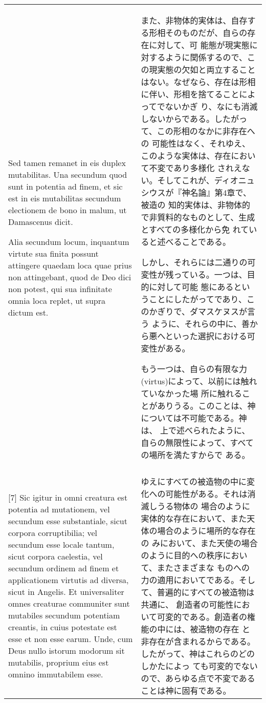 \documentclass[10pt]{jsarticle} %
\begin{document}
\begin{longtable}{p{21em}p{21em}}
Sed tamen remanet in eis duplex mutabilitas. Una secundum quod sunt in
potentia ad finem, et sic est in eis mutabilitas secundum electionem
de bono in malum, ut Damascenus dicit.

Alia secundum locum, inquantum virtute sua finita possunt attingere
quaedam loca quae prius non attingebant, quod de Deo dici non potest,
qui sua infinitate omnia loca replet, ut supra dictum est.

&

また、非物体的実体は、自存する形相そのものだが、自らの存在に対して、可
能態が現実態に対するように関係するので、この現実態の欠如と両立すること
はない。なぜなら、存在は形相に伴い、形相を捨てることによってでないかぎ
り、なにも消滅しないからである。したがって、この形相のなかに非存在への
可能性はなく、それゆえ、このような実体は、存在において不変であり多様化
されえない。そしてこれが、ディオニュシウスが『神名論』第4章で、被造の
知的実体は、非物体的で非質料的なものとして、生成とすべての多様化から免
れていると述べることである。

しかし、それらには二通りの可変性が残っている。一つは、目的に対して可能
態にあるということにしたがってであり、このかぎりで、ダマスケヌスが言う
ように、それらの中に、善から悪へといった選択における可変性がある。

もう一つは、自らの有限な力(virtus)によって、以前には触れていなかった場
所に触れることがありうる。このことは、神については不可能である。神は、
上で述べられたように、自らの無限性によって、すべての場所を満たすからで
ある。

\\


\\

[7] Sic igitur in omni creatura est potentia ad mutationem, vel secundum
esse substantiale, sicut corpora corruptibilia; vel secundum esse
locale tantum, sicut corpora caelestia, vel secundum ordinem ad finem
et applicationem virtutis ad diversa, sicut in Angelis.
Et universaliter omnes creaturae communiter sunt mutabiles secundum
potentiam creantis, in cuius potestate est esse et non esse
earum. Unde, cum Deus nullo istorum modorum sit mutabilis, proprium
eius est omnino immutabilem esse.
&


ゆえにすべての被造物の中に変化への可能性がある。それは消滅しうる物体の
場合のように実体的な存在において、また天体の場合のように場所的な存在の
みにおいて、また天使の場合のように目的への秩序において、またさまざまな
ものへの力の適用においてである。そして、普遍的にすべての被造物は共通に、
創造者の可能性において可変的である。創造者の権能の中には、被造物の存在
と非存在が含まれるからである。したがって、神はこれらのどのしかたによっ
ても可変的でないので、あらゆる点で不変であることは神に固有である。


\end{longtable}
\end{document}
